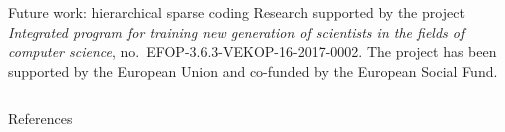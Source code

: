 \documentclass{beamer}
\newlength{\onecolwid}
\begin{document}
\begin{frame}[t]
\begin{columns}[t]
\begin{column}{\onecolwid}
\begin{block}{Future work: hierarchical sparse coding}
        {\footnotesize Research supported by the project \emph{Integrated
        program for training new generation of scientists in the fields of computer
        science}, no.~EFOP-3.6.3-VEKOP-16-2017-0002. The project has been supported
        by the European Union and co-funded by the European Social Fund.}
  \end{block}
\end{column} \end{columns} \end{frame}

  \begin{block}{References}
    \footnotesize
    
    
  \end{block}
\end{document}
